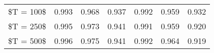 % 
\begin{tabular}{ccccccc}
  \hline
  \hline
\$T = 100\$ & 0.993 & 0.968 & 0.937 & 0.992 & 0.959 & 0.932 \\ 
  \$T = 250\$ & 0.995 & 0.973 & 0.941 & 0.991 & 0.959 & 0.920 \\ 
  \$T = 500\$ & 0.996 & 0.975 & 0.941 & 0.992 & 0.964 & 0.919 \\ 
   \hline
\end{tabular}
